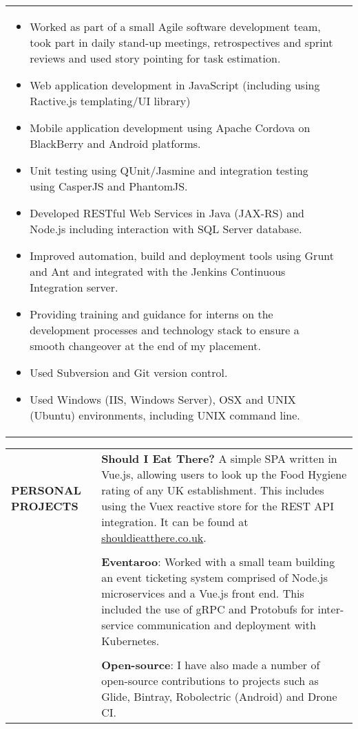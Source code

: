 \documentclass[7pt]{article}
\begin{document}
\begin{longtable}{@{} p{} p{}}
\begin{minipage} [t] {0.85\textwidth}
    \begin{itemize}
      \setlength\itemsep{-1pt}
      \item Worked as part of a small Agile software development team, took part in daily stand-up meetings, retrospectives and sprint reviews and used story pointing for task estimation.
      \item Web application development in JavaScript (including using Ractive.js templating/UI library)
      \item Mobile application development using Apache Cordova on BlackBerry and Android platforms.
      \item Unit testing using QUnit/Jasmine and integration testing using CasperJS and PhantomJS.
      \item Developed RESTful Web Services in Java (JAX-RS) and Node.js including interaction with SQL Server database.
      \item Improved automation, build and deployment tools using Grunt and Ant and integrated with the Jenkins Continuous Integration server.
      \item Providing training and guidance for interns on the development processes and technology stack to ensure a smooth changeover at the end of my placement.
      \item Used Subversion and Git version control.
      \item Used Windows (IIS, Windows Server), OSX and UNIX (Ubuntu) environments, including UNIX command line.
    \end{itemize}
  \end{minipage}
\end{longtable}

\vspace{0.25in}

\begin{tabular}{@{} p{} p{}}
  \textbf{PERSONAL PROJECTS} & \textbf{Should I Eat There?} A simple SPA written in Vue.js, allowing users to look up the Food Hygiene rating of any UK establishment. This includes using the Vuex reactive store for the REST API integration. It can be found at \href{http://shouldieatthere.co.uk}{shouldieatthere.co.uk}. \\
  & \\
  & \textbf{Eventaroo}: Worked with a small team building an event ticketing system comprised of Node.js microservices and a Vue.js front end. This included the use of gRPC and Protobufs for inter-service communication and deployment with Kubernetes. \\
  & \\
  & \textbf{Open-source}: I have also made a number of open-source contributions to projects such as Glide, Bintray, Robolectric (Android) and Drone CI.
\end{tabular}
\end{document}

